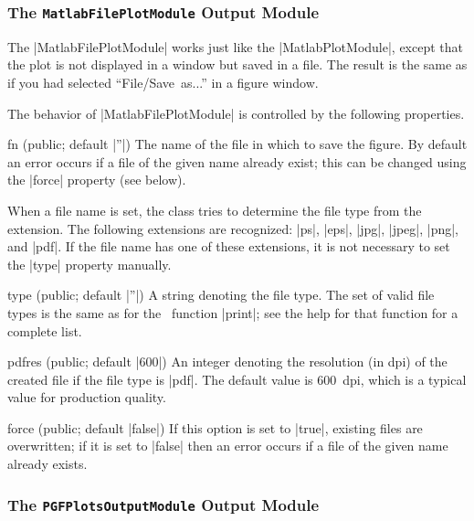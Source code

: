 \subsubsection{The \texttt{MatlabFilePlotModule} Output Module}

The |MatlabFilePlotModule| works just like the |MatlabPlotModule|, except that
the plot is not displayed in a window but saved in a file. The result is the
same as if you had selected ``File\slash Save~as...'' in a figure window. 

The behavior of |MatlabFilePlotModule| is controlled by the following
properties.
\begin{property}{fn (public; default |''|)}
  The name of the file in which to save the figure. By
  default an error occurs if a file of the given name already exist; this can
  be changed using the |force| property (see below).

  When a file name is set, the class tries to determine the file type from the
  extension. The following extensions are recognized: |ps|, |eps|, |jpg|,
  |jpeg|, |png|, and |pdf|. If the file name has one of these extensions, it
  is not necessary to set the |type| property manually.
\end{property}

\begin{property}{type (public; default |''|)}
  A string denoting the file type. The set of valid file
  types is the same as for the \matlab\ function |print|; see the help for
  that function for a complete list. 
\end{property}

\begin{property}{pdfres (public; default |600|)}
  An integer denoting the resolution (in dpi) of the
  created file if the file type is |pdf|. The default value is 600~dpi, which
  is a typical value for production quality.
\end{property}

\begin{property}{force (public; default |false|)}
   If this option is set to |true|, existing files are overwritten; if it is set
   to |false| then an error occurs if a file of the given name already exists.
\end{property}


\subsubsection{The \texttt{PGFPlotsOutputModule} Output Module}

